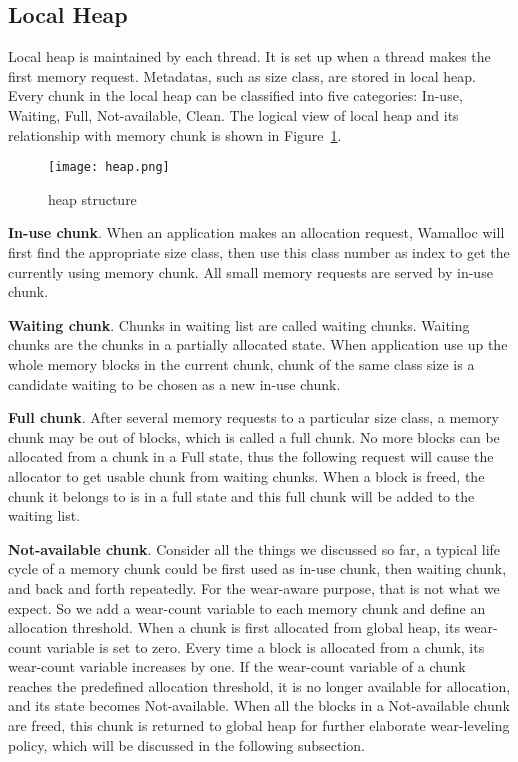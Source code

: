 \documentclass{vldb}
\begin{document}
\subsection{Local Heap}

Local heap is maintained by each thread. 
It is set up when a thread makes the first memory request.
Metadatas, such as size class, are stored in local heap. 
Every chunk in the local heap can be classified into five categories: In-use, Waiting, Full, Not-available, Clean.
The logical view of local heap and its relationship with memory chunk is shown in Figure~\ref{fig:heap}.

\begin{figure}[h]
\centering
\texttt{[image: heap.png]}
\caption{heap structure}
\label{fig:heap}
\end{figure}

\textbf{In-use chunk}. 
When an application makes an allocation request, 
Wamalloc will first find the appropriate size class, then use this class number as index to get the currently using memory chunk. 
All small memory requests are served by in-use chunk.

\textbf{Waiting chunk}. 
Chunks in waiting list are called waiting chunks. 
Waiting chunks are the chunks in a partially allocated state. 
When application use up the whole memory blocks in the current chunk, chunk of the same class size is a candidate waiting to be chosen as a new in-use chunk.

\textbf{Full chunk}. 
After several memory requests to a particular size class, a memory chunk may be out of blocks, which is called a full chunk.
No more blocks can be allocated from a chunk in a Full state, 
thus the following request will cause the allocator to get usable chunk from waiting chunks.
When a block is freed, the chunk it belongs to is in a full state and this full chunk will be added to the waiting list.

\textbf{Not-available chunk}.
Consider all the things we discussed so far, a typical life cycle of a memory chunk could be first used as in-use chunk, then waiting chunk, and back and forth repeatedly. 
For the wear-aware purpose, that is not what we expect. 
So we add a wear-count variable to each memory chunk and define an allocation threshold. 
When a chunk is first allocated from global heap, its wear-count variable is set to zero.
Every time a block is allocated from a chunk, its wear-count variable increases by one. 
If the wear-count variable of a chunk reaches the predefined allocation threshold, it is no longer available for allocation, and its state becomes Not-available. 
When all the blocks in a Not-available chunk are freed, this chunk is returned to global heap for further elaborate wear-leveling policy, which will be discussed in the following subsection.
\end{document}
